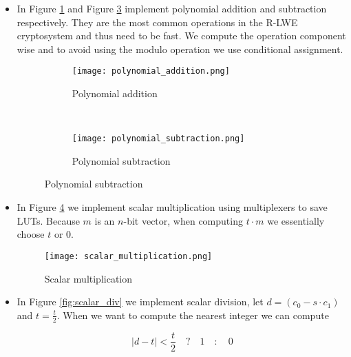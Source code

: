 \begin{itemize}

    \item
        In Figure \ref{fig:poly_add} and Figure \ref{fig:poly_sub} implement
        polynomial addition and subtraction respectively. They are the most
        common operations in the R-LWE cryptosystem and thus need to be fast.
        We compute the operation component wise and to avoid using the modulo
        operation we use conditional assignment.

        \begin{figure}[H]
            \centering
            \begin{subfigure}[b]{0.4\textwidth}
                \centering
                \texttt{[image: polynomial\_addition.png]}
                \caption{Polynomial addition
                \citep{FPGA_Post_Quantum_Primitives}}

                \label{fig:poly_add}
            \end{subfigure}
            ~
            \begin{subfigure}[b]{0.4\textwidth}
                \centering
                \texttt{[image: polynomial\_subtraction.png]}
                \caption{Polynomial subtraction
                \citep{FPGA_Post_Quantum_Primitives}}
                \label{fig:poly_sub}
            \end{subfigure}
        \end{figure}

    \item
        In Figure \ref{fig:scalar_mul} we implement scalar multiplication using
        multiplexers to save LUTs. Because $m$ is an $n$-bit vector, when
        computing $t\cdot m$ we essentially choose $t$ or $0$.

        \begin{figure}[H]
            \centering
            \texttt{[image: scalar\_multiplication.png]}
            \caption{Scalar multiplication \citep{FPGA_Post_Quantum_Primitives}}
            \label{fig:scalar_mul}
        \end{figure}

    \item
        In Figure \ref{fig:scalar_div} we implement scalar division, let
        $d = (c_0 - s \cdot c_1)$ and $t = \frac{t}{2}$. When we want to
        compute the nearest integer we can compute

        \[|d - t| < \frac{t}{2} \quad ? \quad 1 \quad : \quad 0\]


\end{itemize}
